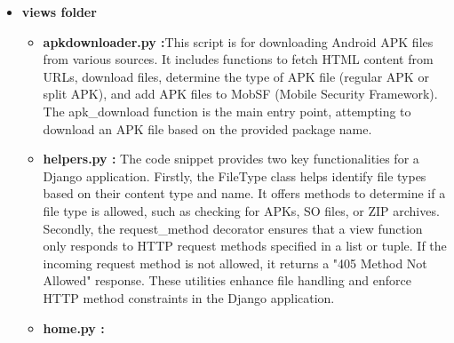 \documentclass{report}
\begin{document}
\begin{itemize}
    \item \textbf{views folder}
    \begin{itemize}
        \item \textbf\textbf {apkdownloader.py :}This script is for downloading Android APK files from various sources. It includes functions to fetch HTML content from URLs, download files, determine the type of APK file (regular APK or split APK), and add APK files to MobSF (Mobile Security Framework). The apk\_download function is the main entry point, attempting to download an APK file based on the provided package name.
        
        \item \textbf\textbf {helpers.py :}
        The code snippet provides two key functionalities for a Django application. Firstly, the FileType class helps identify file types based on their content type and name. It offers methods to determine if a file type is allowed, such as checking for APKs, SO files, or ZIP archives. Secondly, the request\_method decorator ensures that a view function only responds to HTTP request methods specified in a list or tuple. If the incoming request method is not allowed, it returns a "405 Method Not Allowed" response. These utilities enhance file handling and enforce HTTP method constraints in the Django application.
        \item \textbf\textbf {home.py :}
        

\end{itemize}
\end{itemize}
\end{document}
